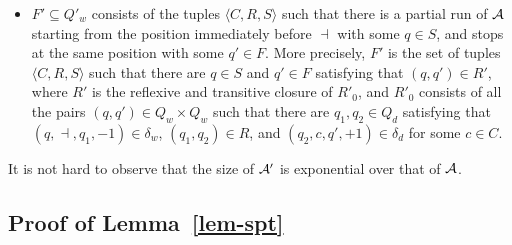 {\begin{itemize}
\begin{itemize}
\begin{itemize}
\item $c'=\bigwedge \limits_{c \in C} c \wedge \bigwedge \limits_{c \in \Cc_\cA \setminus C} \overline{c}$, 
\item $R'$ is the reflexive and transitive closure of $R'_0$, where $R'_0$ consists of all the pairs $(q,q') \in Q_d \times Q_d$ such that there are $q_1,q_2 \in Q_w$ satisfying that $(q,c,q_1,-1) \in \delta_d$ for some $c \in C$, $(q_1,q_2) \in R$, and $(q_2,a,q',+1) \in \delta_w$, 
\item $S'=\{q' \in Q_w \mid \exists q \in S, q_1 \in Q_d.\ (q,q_1) \in R', (q_1,c,q',+1) \in \delta_d \mbox{ for some } c \in C\}$.
\end{itemize}
%
\item Let $\langle C,R,S\rangle \in Q'_w$ and $\langle a,R',S'\rangle \in Q'_d$. Then $\delta'_w(\langle C,R,S \rangle, a)=\langle a, R',S'\rangle$ iff the following conditions hold, 
\begin{itemize}
\item $R'$ is the reflexive and transitive closure of $R'_0$, where $R'_0$ consists of all the pairs $(q,q') \in Q_w \times Q_w$ such that there are $q_1,q_2 \in Q_d$ satisfying that $(q,a,q_1,-1) \in \delta_w$, $(q_1,q_2) \in R$, and $(q_2,c,q',+1) \in \delta_d$ for some $c \in C$, 
\item $S'=\{q' \in Q_d \mid \exists q \in S, q_1 \in Q_w.\ (q,q_1) \in R', (q_1,a,q',+1) \in \delta_w\}$.
\end{itemize}
%
\end{itemize}
%
\item $F' \subseteq Q'_w$ consists of the tuples $\langle C, R, S\rangle$ such that there is a partial run of $\mathcal{A}$ starting from the position immediately before $\dashv$ with some $q \in S$, and stops at the same position with some $q' \in F$. More precisely, $F'$ is the set of tuples $\langle C, R, S\rangle$ such that there are $q \in S$ and $q' \in F$ satisfying that $(q,q') \in R'$, where $R'$ is the reflexive and transitive closure of $R'_0$, and $R'_0$ consists of all the pairs $(q,q') \in Q_w \times Q_w$ such that there are $q_1,q_2 \in Q_d$ satisfying that $(q,\dashv,q_1,-1) \in \delta_w$, $(q_1,q_2) \in R$, and $(q_2,c,q',+1) \in \delta_d$ for some $c \in C$.
\end{itemize}
It is not hard to observe that the size of $\mathcal{A}'$ is exponential over that of $\mathcal{A}$.
}

\subsection{Proof of Lemma~\ref{lem-spt}}